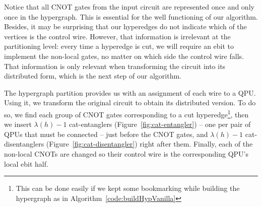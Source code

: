 Notice that all CNOT gates from the input circuit are represented once and only once in the hypergraph. This is essential for the well functioning of our algorithm. Besides, it may be surprising that our hyperedges do not indicate which of the vertices is the control wire. However, that information is irrelevant at the partitioning level: every time a hyperedge is cut, we will require an ebit to implement the non-local gates, no matter on which side the control wire falls. That information is only relevant when transforming the circuit into its distributed form, which is the next step of our algorithm. 

The hypergraph partition provides us with an assignment of each wire to a QPU. Using it, we transform the original circuit to obtain its distributed version. To do so, we find each group of CNOT gates corresponding to a cut hyperedge\footnote{This can be done easily if we kept some bookmarking while building the hypergraph as in Algorithm~\ref{code:buildHypVanilla}}, then we insert \(\lambda(h)-1\) cat-entanglers (Figure~\ref{fig:cat-entangler}) -- one per pair of QPUs that must be connected -- just before the CNOT gates, and \(\lambda(h)-1\) cat-disentanglers (Figure~\ref{fig:cat-disentangler}) right after them. Finally, each of the non-local CNOTs are changed so their control wire is the corresponding QPU's local ebit half.


\begin{comment}
\begin{algorithm}[caption={Algorithm for distributing a circuit using an assignment \(qpuOf \colon \mathbb{N} \to \mathbb{N}\) which indicates the QPU number of the given wire},label={code:distribution}]
input: circuit, $qpuOf$
output: distributed
begin
  distributed $\gets$ $emptyCircuit$
  foreach wire in circuit do
    thisQPU = $qpuOf$(wire)
    activeConnections $\gets$ $\varnothing$
    foreach gate in wire do
      if gate == CNOT and $controlOf$(gate) == wire then
        targetQPU = $qpuOf$($targetOf$(gate))
        if targetQPU == thisQPU then
          distributed.$addCNOTAt$(wire,target)
        else
          ebit $\gets$ activeConnections.$at$(targetQPU)
          if ebit == null then
            ebit $\gets$ $distillEbit$(thisQPU, targetQPU)
            distributed.$addCatEntangler$(ebit, wire)
            activeConnections.$at$(targetQPU) $\gets$ ebit
          distributed.$addCNOTAt$(ebit,$targetOf$(gate))
      else
        distributed.$addGateAt$(gate,wire)
end
\end{algorithm}
\end{comment}


